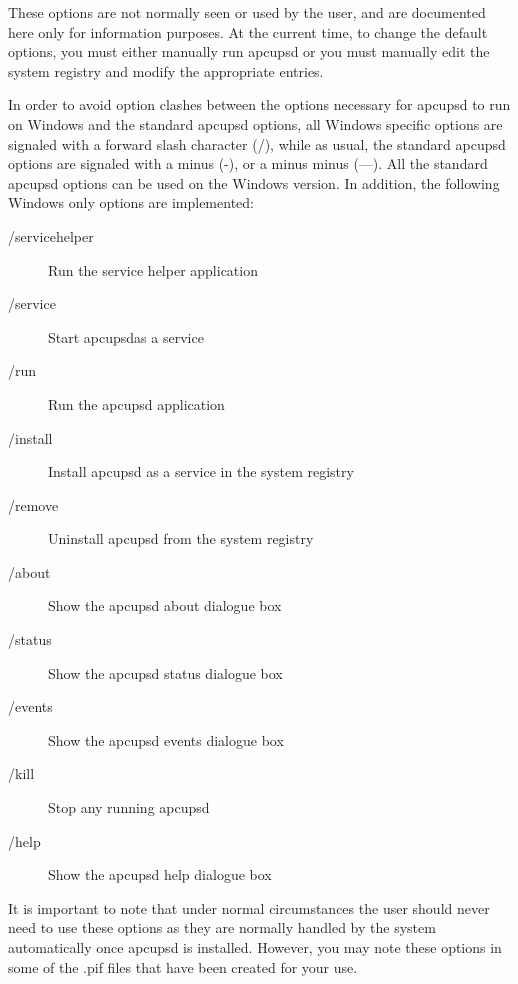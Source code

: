 {{{{{{{\label{index-Windows_002c-Options-186}
These options are not normally seen or used by the user, and are documented
here only for information purposes. At the current time, to change the default
options, you must either manually run apcupsd or you must manually edit the
system registry and modify the appropriate entries.  

In order to avoid option clashes between the options necessary for apcupsd to
run on Windows and the standard apcupsd options, all Windows specific options
are signaled with a forward slash character (/), while as usual, the standard
apcupsd options are signaled with a minus (-), or a minus minus ({---}). All
the standard apcupsd options can be used on the Windows version. In addition,
the following Windows only options are implemented:  

\begin{description}

\item [/servicehelper]
   Run the service helper application  

\item [/service]
   Start apcupsdas a service  

\item [/run]
   Run the apcupsd application  

\item [/install]
   Install apcupsd as a service in the system registry  

\item [/remove]
   Uninstall apcupsd from the system registry  

\item [/about]
   Show the apcupsd about dialogue box  

\item [/status]
   Show the apcupsd status dialogue box  

\item [/events]
   Show the apcupsd events dialogue box  

\item [/kill]
   Stop any running apcupsd  

\item [/help]
   Show the apcupsd help dialogue box 
\end{description}

It is important to note that under normal circumstances the user should never
need to use these options as they are normally handled by the system
automatically once apcupsd is installed. However, you may note these options
in some of the .pif files that have been created for your use. 

}}}}}}}
